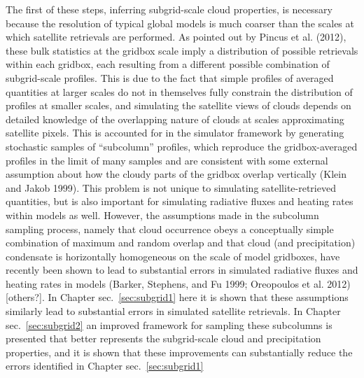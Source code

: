 The first of these steps, inferring subgrid-scale cloud properties, is
necessary because the resolution of typical global models is much
coarser than the scales at which satellite retrievals are performed. As
pointed out by Pincus et al. (2012), these bulk statistics at the
gridbox scale imply a distribution of possible retrievals within each
gridbox, each resulting from a different possible combination of
subgrid-scale profiles. This is due to the fact that simple profiles of
averaged quantities at larger scales do not in themselves fully
constrain the distribution of profiles at smaller scales, and simulating
the satellite views of clouds depends on detailed knowledge of the
overlapping nature of clouds at scales approximating satellite pixels.
This is accounted for in the simulator framework by generating
stochastic samples of ``subcolumn'' profiles, which reproduce the
gridbox-averaged profiles in the limit of many samples and are
consistent with some external assumption about how the cloudy parts of
the gridbox overlap vertically (Klein and Jakob 1999). This problem is
not unique to simulating satellite-retrieved quantities, but is also
important for simulating radiative fluxes and heating rates within
models as well. However, the assumptions made in the subcolumn sampling
process, namely that cloud occurrence obeys a conceptually simple
combination of maximum and random overlap and that cloud (and
precipitation) condensate is horizontally homogeneous on the scale of
model gridboxes, have recently been shown to lead to substantial errors
in simulated radiative fluxes and heating rates in models (Barker,
Stephens, and Fu 1999; Oreopoulos et al. 2012) {[}others?{]}. In Chapter
sec.~\ref{sec:subgrid1} here it is shown that these assumptions
similarly lead to substantial errors in simulated satellite retrievals.
In Chapter sec.~\ref{sec:subgrid2} an improved framework for sampling
these subcolumns is presented that better represents the subgrid-scale
cloud and precipitation properties, and it is shown that these
improvements can substantially reduce the errors identified in Chapter
sec.~\ref{sec:subgrid1}

